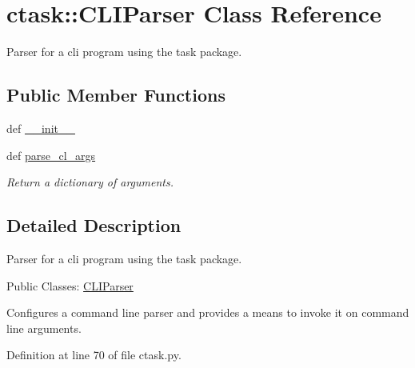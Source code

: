 \hypertarget{classctask_1_1CLIParser}{
\section{ctask\-:\-:\-C\-L\-I\-Parser \-Class \-Reference}
\label{classctask_1_1CLIParser}
}


\-Parser for a cli program using the task package.  


\subsection*{\-Public \-Member \-Functions}
\begin{DoxyCompactItemize}
\item 
def \hyperlink{classctask_1_1CLIParser_ab39b061e281bed5717a78c8a50ba5ba3}{\-\_\-\-\_\-init\-\_\-\-\_\-}
\item 
def \hyperlink{classctask_1_1CLIParser_a1bedc6576c66317dcea0e4ab565bfc49}{parse\-\_\-cl\-\_\-args}
\begin{DoxyCompactList}\small\item\em \-Return a dictionary of arguments. \end{DoxyCompactList}\end{DoxyCompactItemize}


\subsection{\-Detailed \-Description}
\-Parser for a cli program using the task package. 

\-Public \-Classes\-: \hyperlink{classctask_1_1CLIParser}{\-C\-L\-I\-Parser}

\-Configures a command line parser and provides a means to invoke it on command line arguments. 

\-Definition at line 70 of file ctask.\-py.



